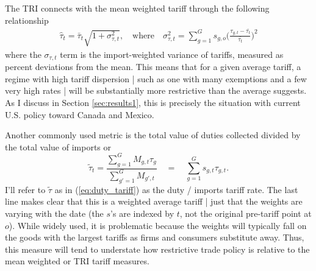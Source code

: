 \documentclass[12pt,pdftex]{article}
\begin{document}
\begin{onehalfspacing}
The TRI connects with the mean weighted tariff through the following relationship
\begin{align}
\hat{\tau}_{t} = \bar{\tau}_{t}\sqrt{1 + \sigma_{\tau,t}^2}, \quad \mbox{where} \quad \sigma_{\tau,t}^2 = \sum\limits_{g=1}^G s_{g,o}\bigg(\frac{\tau_{g,t} - \bar{\tau_{t}}}{\bar{\tau_{t}}}\bigg)^2
\label{eq:TRI3}
\end{align}
where the $\sigma_{\tau,t}$ term is the import-weighted variance of tariffs, measured as percent deviations from the mean. This means that for a given average tariff, a regime with high tariff dispersion | such as one with many exemptions and a few very high rates | will be substantially more restrictive than the average suggests. As I discuss in Section \ref{sec:results1}, this is precisely the situation with current U.S. policy toward Canada and Mexico.

Another commonly used metric is the total value of duties collected divided by the total value of imports or
\begin{equation}
\tilde{\tau}_{t} = \frac{\sum\limits_{g=1}^G M_{g,t}\tau_g}{\sum\limits_{g'=1}^G  M_{g',t}} \quad = \quad \sum_{g=1}^G s_{g,t} \tau_{g,t}. \label{eq:duty_tariff}
\end{equation}
I'll refer to $\tilde{\tau}$ as in (\ref{eq:duty_tariff}) as the duty / imports tariff rate. The last line makes clear that this is a weighted average tariff | just that the weights are varying with the date (the $s$'s are indexed by $t$, not the original pre-tariff point at $o$). While widely used, it is problematic because the weights will typically fall on the goods with the largest tariffs as firms and consumers substitute away. Thus, this measure will tend to understate how restrictive trade policy is relative to the mean weighted or TRI tariff measures.




\end{onehalfspacing}
\end{document}

